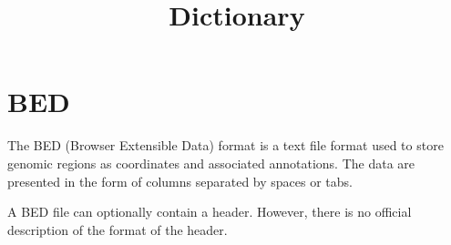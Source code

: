 \documentclass[11pt]{article}
\title{Dictionary}
\author{}
\date{}
\begin{document}
\begin{sloppypar}
  \maketitle

  \linenumbers

\section{BED}
The BED (Browser Extensible Data) format is a text file format used to store genomic regions as coordinates and associated annotations. 
The data are presented in the form of columns separated by spaces or tabs.
  
\par
  
A BED file can optionally contain a header. 
However, there is no official description of the format of the header.
  
\par
  

\end{sloppypar}
\end{document}
